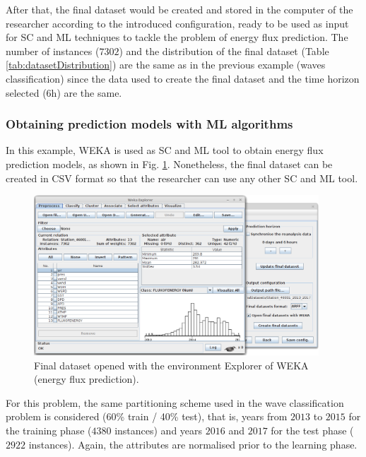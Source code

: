\documentclass[energies,article,submit,moreauthors,pdftex]{Definitions/mdpi}
\begin{document}
			After that, the final dataset would be created and stored in the computer of the researcher according to the introduced configuration, ready to be used as input for SC and ML techniques to tackle the problem of energy flux prediction. The number of instances ($7302$) and the distribution of the final dataset (Table \ref{tab:datasetDistribution}) are the same as in the previous example (waves classification) since the data used to create the final dataset and the time horizon selected (6h) are the same.

		\subsubsection{Obtaining prediction models with ML algorithms}

			In this example, WEKA is used as SC and ML tool to obtain energy flux prediction models, as shown in Fig. \ref{fig:openigFinalDatasetWeka_EF}. Nonetheless, the final dataset can be created in CSV format so that the researcher can use any other SC and ML tool.

			\begin{figure}[ht!]
				\centering
				\includegraphics[width=0.95\textwidth]{figures/FigureOpeningFinalDatasetWeka_EF.png}
				\caption{Final dataset opened with the environment Explorer of WEKA (energy flux prediction).}
				\label{fig:openigFinalDatasetWeka_EF}
			\end{figure}
			
			For this problem, the same partitioning scheme used in the wave classification problem is considered (60\% train / 40\% test), that is, years from $2013$ to $2015$ for the training phase ($4380$ instances) and years $2016$ and $2017$ for the test phase ($2922$ instances). Again, the attributes are normalised prior to the learning phase.
			
\end{document}
